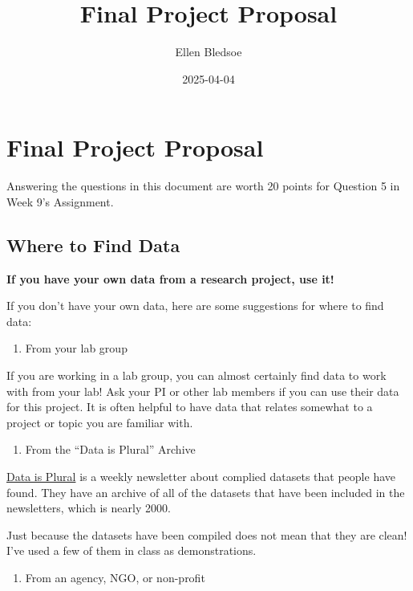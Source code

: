 \documentclass[
]{article}
\title{Final Project Proposal}
\author{Ellen Bledsoe}
\date{2025-04-04}
\providecommand{\tightlist}{%
  \setlength{\itemsep}{0pt}\setlength{\parskip}{0pt}}
\begin{document}
\maketitle

\section{Final Project Proposal}\label{final-project-proposal}

Answering the questions in this document are worth 20 points for
Question 5 in Week 9's Assignment.

\subsection{Where to Find Data}\label{where-to-find-data}

\textbf{If you have your own data from a research project, use it!}

If you don't have your own data, here are some suggestions for where to
find data:

\begin{enumerate}
\def\labelenumi{\arabic{enumi}.}
\tightlist
\item
  From your lab group
\end{enumerate}

If you are working in a lab group, you can almost certainly find data to
work with from your lab! Ask your PI or other lab members if you can use
their data for this project. It is often helpful to have data that
relates somewhat to a project or topic you are familiar with.

\begin{enumerate}
\def\labelenumi{\arabic{enumi}.}
\setcounter{enumi}{1}
\tightlist
\item
  From the ``Data is Plural'' Archive
\end{enumerate}

\href{https://www.data-is-plural.com/}{Data is Plural} is a weekly
newsletter about complied datasets that people have found. They have an
archive of all of the datasets that have been included in the
newsletters, which is nearly 2000.

Just because the datasets have been compiled does not mean that they are
clean! I've used a few of them in class as demonstrations.

\begin{enumerate}
\def\labelenumi{\arabic{enumi}.}
\setcounter{enumi}{2}
\tightlist
\item
  From an agency, NGO, or non-profit
\end{enumerate}
\end{document}
